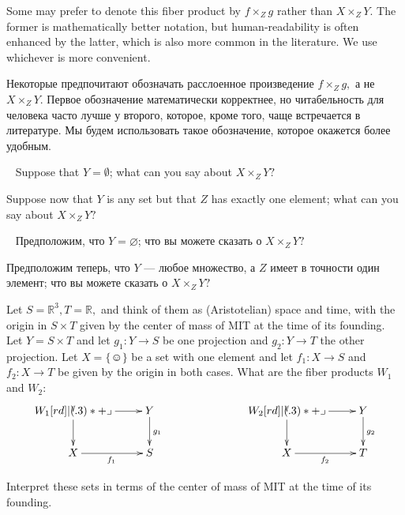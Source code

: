 \documentclass[../main/CT4S-EN-RU]{subfiles}
\begin{document}
\begin{remarkENG}
Some may prefer to denote this fiber product by $f\times_Zg$ rather than $X\times_ZY.$ The former is  mathematically better notation, but human-readability is often enhanced by the latter, which is also more common in the literature. We use whichever is more convenient.
\end{remarkENG}

\begin{remarkRUS}
Некоторые предпочитают обозначать расслоенное произведение $f\times_Zg,$ а не $X\times_ZY.$ Первое обозначение математически корректнее, но читабельность для человека часто лучше у второго, которое, кроме того, чаще встречается в литературе. Мы будем использовать такое обозначение, которое окажется более удобным.
\end{remarkRUS}

\begin{exerciseENG}~
\sexc Suppose that $Y=\emptyset$; what can you say about $X\times_ZY?$ 
\item Suppose now that $Y$ is any set but that $Z$ has exactly one element; what can you say about $X\times_ZY?$
\endsexc
\end{exerciseENG}

\begin{exerciseRUS}~
\sexc Предположим, что $Y=\varnothing$; что вы можете сказать о $X\times_ZY?$ 
\item Предположим теперь, что $Y$ — любое множество, а $Z$ имеет в точности один элемент; что вы можете сказать о $X\times_ZY?$
\endsexc
\end{exerciseRUS}

\begin{exerciseENG}
Let $S={ℝ}^3, T={ℝ},$ and think of them as (Aristotelian) space and time, with the origin in $S\times T$ given by the center of mass of MIT at the time of its founding. Let $Y=S\times T$ and let $g_1\colon Y{→} S$ be one projection and $g_2\colon Y{→} T$ the other projection. Let $X={\{☺\}}$ be a set with one element and let $f_1\colon X{→} S$ and $f_2\colon X{→} T$ be given by the origin in both cases. 
\sexc What are the fiber products $W_1$ and $W_2$:
$$
\xymatrix{W_1\ar[r]\ar[d]\ullimit&Y\ar[d]^{g_1}\\X\ar[r]_{f_1}&S}\hspace{1in}
\xymatrix{W_2\ar[r]\ar[d]\ullimit&Y\ar[d]^{g_2}\\X\ar[r]_{f_2}&T}
$$
\item Interpret these sets in terms of the center of mass of MIT at the time of its founding.
\endsexc
\end{exerciseENG}
\end{document}
